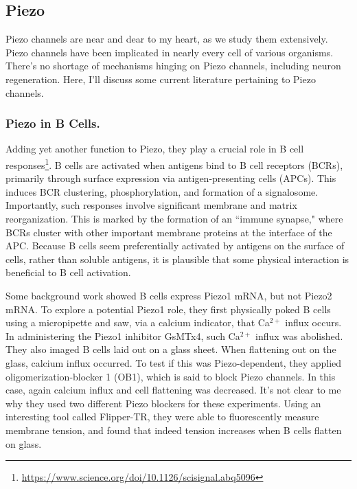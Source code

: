 \documentclass[12pt]{report}
\begin{document}
\subsection{Piezo}

Piezo channels are near and dear to my heart, as we study them extensively. Piezo channels have been implicated in nearly every cell of various organisms. There's no shortage of mechanisms hinging on Piezo channels, including neuron regeneration. Here, I'll discuss some current literature pertaining to Piezo channels. 


\subsubsection{Piezo in B Cells.}

Adding yet another function to Piezo, they play a crucial role in B cell responses\footnote{\url{https://www.science.org/doi/10.1126/scisignal.abq5096}}. B cells are activated when antigens bind to B cell receptors (BCRs), primarily through surface expression via antigen-presenting cells (APCs). This induces BCR clustering, phosphorylation, and formation of a signalosome. Importantly, such responses involve significant membrane and matrix reorganization. This is marked by the formation of an ``immune synapse," where BCRs cluster with other important membrane proteins at the interface of the APC. Because B cells seem preferentially activated by antigens on the surface of cells, rather than soluble antigens, it is plausible that some physical interaction is beneficial to B cell activation.\newline

Some background work showed B cells express Piezo1 mRNA, but not Piezo2 mRNA. To explore a potential Piezo1 role, they first physically poked B cells using a micropipette and saw, via a calcium indicator, that Ca$^{2+}$ influx occurs. In administering the Piezo1 inhibitor GsMTx4, such Ca$^{2+}$ influx was abolished. They also imaged B cells laid out on a glass sheet. When flattening out on the glass, calcium influx occurred. To test if this was Piezo-dependent, they applied oligomerization-blocker 1 (OB1), which is said to block Piezo channels. In this case, again calcium influx and cell flattening was decreased. It's not clear to me why they used two different Piezo blockers for these experiments. Using an interesting tool called Flipper-TR, they were able to fluorescently measure membrane tension, and found that indeed tension increases when B cells flatten on glass.\newline
\end{document}
